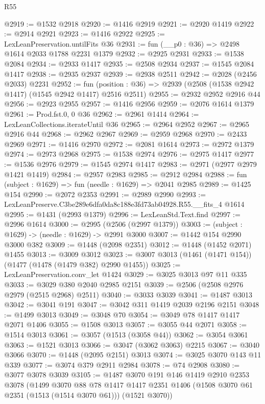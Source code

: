 \begin{lexlean}{R55}
\begin{coremodule}
{{@2919 := @1532 @2918
@2920 := @1416 @2919
@2921 := @2920 @1419
@2922 := @2914 @2921
@2923 := @1416 @2922
@2925 := LexLeanPreservation.untilFits @36
@2931 := fun (__p0 : @36) => @2498 @1614 @2033 @1788 @2231 @1379
@2932 := @2925 @2931
@2933 := @1538 @2084
@2934 := @2933 @1417
@2935 := @2508 @2934
@2937 := @1545 @2084 @1417
@2938 := @2935 @2937
@2939 := @2938 @2511
@2942 := @2028 (@2456 @2033) @2231
@2952 := fun (position : @36) => @2939 (@2508 (@1538 @2942 @1417) (@1545 @2942 @1417) @2516 @2511)
@2955 := @2932 @2952 @2916 @44
@2956 := @2923 @2955
@2957 := @1416 @2956
@2959 := @2076 @1614 @1379
@2961 := Prod.fst.{0, 0} @36
@2962 := @2961 @1414
@2964 := LexLeanCollections.iterateUntil @36
@2965 := @2964 @2952
@2967 := @2965 @2916 @44
@2968 := @2962 @2967
@2969 := @2959 @2968
@2970 := @2433 @2969
@2971 := @1416 @2970
@2972 := @2081 @1614
@2973 := @2972 @1379
@2974 := @2973 @2968
@2975 := @1538 @2974
@2976 := @2975 @1417
@2977 := @1536 @2976
@2979 := @1545 @2974 @1417
@2983 := @2971 (@2977 @2979 @1421 @1419)
@2984 := @2957 @2983
@2985 := @2912 @2984
@2988 := fun (subject : @1629) => fun (needle : @1629) => @2041 @2985
@2989 := @1425 @154
@2990 := @2072 @2353
@2991 := @2989 @2990
@2993 := LexLeanPreserve.C3be289e6dfa0da8c188e3fd73ab04928.R55.__fits_4 @1614
@2995 := @1431 (@2993 @1379)
@2996 := LexLeanStd.Text.find
@2997 := @2996 @1614
@3000 := @2995 (@2506 (@2997 @1379))
@3003 := (subject : @1629) -> (needle : @1629) -> @2991 @3000
@3007 := @1442 @154 @2990 @3000 @382
@3009 := @1448 (@2098 @2351)
@3012 := @1448 (@1452 @2071) @1455
@3013 := @3009 @3012
@3023 := @3007 @3013 (@1461 (@1471 @154)) (@1477 (@1478 (@1479 @382) @2990 @1455))
@3025 := LexLeanPreservation.conv_let @1424
@3029 := @3025 @3013 @97 @11 @335
@3033 := @3029 @380 @2040 @2985 @2151
@3039 := @2506 (@2508 @2976 @2979 (@2515 @2968) @2511)
@3040 := @3033 @3039
@3041 := @1487 @3013
@3042 := @3041 @191
@3047 := @3042 @311 @1419 @2039 @2196 @2151
@3048 := @1499 @3013
@3049 := @3048 @70
@3054 := @3049 @78 @1417 @1417 @2071 @1406
@3055 := @1508 @3013
@3057 := @3055 @44 @2071
@3058 := @1514 @3013
@3061 := @3057 (@1513 (@3058 @44))
@3062 := @3054 @3061
@3063 := @1521 @3013
@3066 := @3047 (@3062 @3063) @2215
@3067 := @3040 @3066
@3070 := @1448 (@2095 @2151) @3013
@3074 := @3025 @3070 @143 @11 @339
@3077 := @3074 @379 @2911 @2984
@3078 := @74 @2908
@3080 := @3077 @3078 @3039
@3105 := @1487
    @3070
    @191
    @146
    @1419
    @2910
    @2353
    @3078
    (@1499
      @3070
      @88
      @78
      @1417
      @1417
      @2351
      @1406
      (@1508 @3070 @61 @2351 (@1513 (@1514 @3070 @61)))
      (@1521 @3070))
}}
\end{coremodule}
\end{lexlean}
